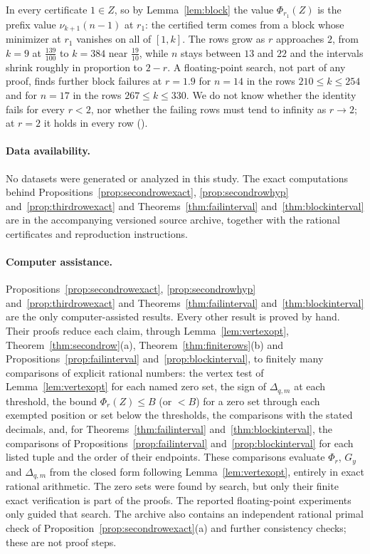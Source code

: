 \documentclass[11pt]{article}
\begin{document}
In every certificate $1\in Z$, so by Lemma~\ref{lem:block} the value
$\Phi_{r_1}(Z)$ is the prefix value $\nu_{k+1}(n-1)$ at $r_1$: the certified
term comes from a block whose minimizer at $r_1$ vanishes on all of $[1,k]$.  The rows
grow as $r$ approaches $2$, from $k=9$ at $\frac{139}{100}$ to
$k=384$ near $\frac{19}{10}$, while $n$ stays between $13$ and
$22$ and the intervals shrink roughly in proportion to $2-r$.  A
floating-point search, not part of any proof, finds further block
failures at $r=1.9$ for $n=14$ in the rows $210\le k\le254$ and for $n=17$ in
the rows $267\le k\le330$.  We do not know whether the identity fails for
every $r<2$, nor whether the failing rows must tend to infinity as
$r\to2$; at $r=2$ it holds in every row (\cite[Theorem~5.3]{coefficient-mass-rows}).

\paragraph{Data availability.}
No datasets were generated or analyzed in this study.  The exact
computations behind Propositions~\ref{prop:secondrowexact},
\ref{prop:secondrowhyp} and~\ref{prop:thirdrowexact} and
Theorems~\ref{thm:failinterval} and~\ref{thm:blockinterval} are in
the accompanying versioned source archive, together with the rational
certificates and reproduction instructions.

\paragraph{Computer assistance.}
Propositions~\ref{prop:secondrowexact}, \ref{prop:secondrowhyp}
and~\ref{prop:thirdrowexact} and Theorems~\ref{thm:failinterval}
and~\ref{thm:blockinterval} are the only computer-assisted results.  Every
other result is proved by hand.  Their proofs reduce each claim, through
Lemma~\ref{lem:vertexopt},
Theorem~\ref{thm:secondrow}(a), Theorem~\ref{thm:finiterows}(b) and
Propositions~\ref{prop:failinterval} and~\ref{prop:blockinterval}, to
finitely many comparisons of explicit rational numbers: the vertex test of
Lemma~\ref{lem:vertexopt} for each named zero set, the sign of
$\Delta_{q,m}$ at each threshold, the bound $\Phi_r(Z)\le B$ (or $<B$) for
a zero set through each exempted position or set below the thresholds,
the comparisons with the stated decimals, and, for
Theorems~\ref{thm:failinterval} and~\ref{thm:blockinterval}, the
comparisons of Propositions~\ref{prop:failinterval}
and~\ref{prop:blockinterval} for each listed tuple and the order of
their endpoints.  These comparisons evaluate $\Phi_r$, $G_y$ and
$\Delta_{q,m}$ from the closed form following
Lemma~\ref{lem:vertexopt}, entirely in exact rational arithmetic.  The zero
sets were found by search, but only their finite exact verification is part
of the proofs.  The reported floating-point experiments only guided that
search.  The archive also contains an independent rational primal check of
Proposition~\ref{prop:secondrowexact}(a) and further consistency checks;
these are not proof steps.
\end{document}

